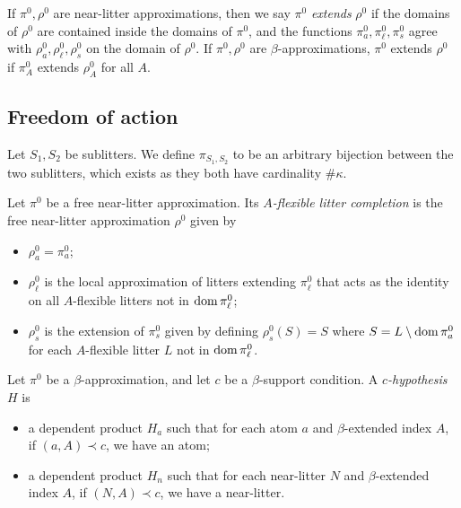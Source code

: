 \documentclass{article}
\begin{document}
\begin{definition}
    If \( \pi^0, \rho^0 \) are near-litter approximations, then we say \( \pi^0 \) \emph{extends} \( \rho^0 \) if the domains of \( \rho^0 \) are contained inside the domains of \( \pi^0 \), and the functions \( \pi^0_a, \pi^0_\ell, \pi^0_s \) agree with \( \rho^0_a, \rho^0_\ell, \rho^0_s \) on the domain of \( \rho^0 \).
    If \( \pi^0, \rho^0 \) are \( \beta \)-approximations, \( \pi^0 \) extends \( \rho^0 \) if \( \pi^0_A \) extends \( \rho^0_A \) for all \( A \).
\end{definition}

\subsection{Freedom of action}

\begin{definition}
    Let \( S_1, S_2 \) be sublitters.
    We define \( \pi_{S_1,S_2} \) to be an arbitrary bijection between the two sublitters, which exists as they both have cardinality \( \#\kappa \).
\end{definition}
\begin{definition}
    Let \( \pi^0 \) be a free near-litter approximation.
    Its \emph{\( A \)-flexible litter completion} is the free near-litter approximation \( \rho^0 \) given by
    \begin{itemize}
        \item \( \rho^0_a = \pi^0_a \);
        \item \( \rho^0_\ell \) is the local approximation of litters extending \( \pi^0_\ell \) that acts as the identity on all \( A \)-flexible litters not in \( \operatorname{dom} \pi^0_\ell \);
        \item \( \rho^0_s \) is the extension of \( \pi^0_s \) given by defining \( \rho^0_s(S) = S \) where \( S = L \setminus \operatorname{dom} \pi^0_a \) for each \( A \)-flexible litter \( L \) not in \( \operatorname{dom} \pi^0_\ell \).
    \end{itemize}
\end{definition}
\begin{ih}
    Let \( \pi^0 \) be a \( \beta \)-approximation, and let \( c \) be a \( \beta \)-support condition.
    A \emph{\( c \)-hypothesis} \( H \) is
    \begin{itemize}
        \item a dependent product \( H_a \) such that for each atom \( a \) and \( \beta \)-extended index \( A \), if \( (a, A) \prec c \), we have an atom;
        \item a dependent product \( H_n \) such that for each near-litter \( N \) and \( \beta \)-extended index \( A \), if \( (N, A) \prec c \), we have a near-litter.
    \end{itemize}
\end{ih}
\end{document}
